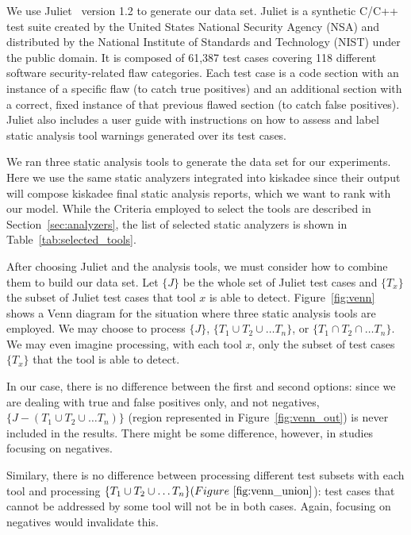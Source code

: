 We use Juliet~\citep{juliet} version 1.2 to generate our data set. Juliet is a
synthetic C/C++ test suite created by the United States National Security
Agency (NSA) and distributed by the National Institute of Standards and
Technology (NIST) under the public domain. It is composed of 61,387 test cases
covering 118 different software security-related flaw categories. Each test
case is a code section with an instance of a specific flaw (to catch true
positives) and an additional section with a correct, fixed instance of that
previous flawed section (to catch false positives).  Juliet also includes a
user guide with instructions on how to assess and label static analysis tool
warnings generated over its test cases.

We ran three static analysis tools to generate the data set for our
experiments. Here we use the same static analyzers integrated into
kiskadee since their output will compose kiskadee final
static analysis reports, which we want to rank with our model.
While the Criteria employed to select the tools are described
in Section~\ref{sec:analyzers}, the list of selected static
analyzers is shown in Table~\ref{tab:selected_tools}.

After choosing Juliet and the analysis tools, we must consider how to combine
them to build our data set. Let $\{J\}$ be the whole set of Juliet test cases
and $\{T_x\}$ the subset of Juliet test cases that tool $x$ is able to detect.
Figure~\ref{fig:venn} shows a Venn diagram for the situation where three static
analysis tools are employed. We may choose to process $\{J\}$, $\{T_1 \cup
T_2\cup\dots T_n\}$, or $\{T_1 \cap T_2 \cap\dots T_n\}$. We may even imagine
processing, with each tool $x$, only the subset of test cases $\{T_x\}$ that
the tool is able to detect.



In our case, there is no difference
between the first and second options: since we are dealing with
true and false positives only, and not negatives, $\{J - (T_1 \cup T_2\cup\dots T_n)\}$
(region represented in Figure~\ref{fig:venn_out})
is never included in the results. There might be some difference,
however, in studies focusing on negatives.



Similary, there is no difference between processing different test
subsets with each tool and processing $\{T_1 \cup T_2\cup\dots T_n\} (Figure~\ref{fig:venn_union}$):
test cases that cannot be addressed by some tool will not be in
both cases. Again, focusing on negatives would invalidate this.

